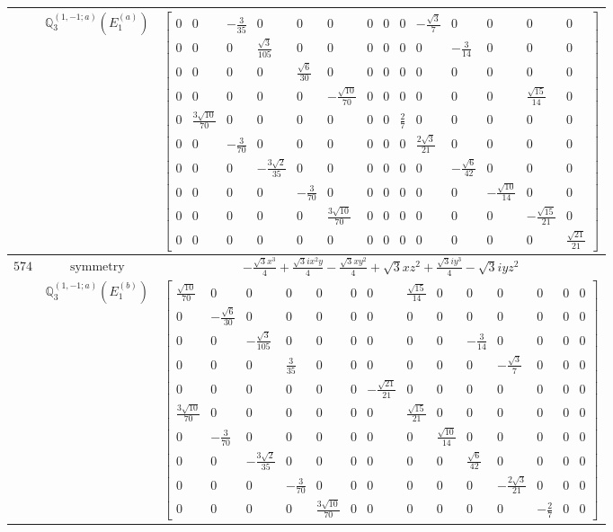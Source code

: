 \documentclass[fleqn,8pt,landscape]{jsarticle}
\begin{document}
\begin{longtable}{ccc}
$  $ & $ \mathbb{Q}_{3}^{(1,-1;a)}(E_{1}^{(a)}) $ & $ \begin{bmatrix} 0 & 0 & - \frac{3}{35} & 0 & 0 & 0 & 0 & 0 & 0 & - \frac{\sqrt{3}}{7} & 0 & 0 & 0 & 0 \\ 0 & 0 & 0 & \frac{\sqrt{3}}{105} & 0 & 0 & 0 & 0 & 0 & 0 & - \frac{3}{14} & 0 & 0 & 0 \\ 0 & 0 & 0 & 0 & \frac{\sqrt{6}}{30} & 0 & 0 & 0 & 0 & 0 & 0 & 0 & 0 & 0 \\ 0 & 0 & 0 & 0 & 0 & - \frac{\sqrt{10}}{70} & 0 & 0 & 0 & 0 & 0 & 0 & \frac{\sqrt{15}}{14} & 0 \\ 0 & \frac{3 \sqrt{10}}{70} & 0 & 0 & 0 & 0 & 0 & 0 & \frac{2}{7} & 0 & 0 & 0 & 0 & 0 \\ 0 & 0 & - \frac{3}{70} & 0 & 0 & 0 & 0 & 0 & 0 & \frac{2 \sqrt{3}}{21} & 0 & 0 & 0 & 0 \\ 0 & 0 & 0 & - \frac{3 \sqrt{2}}{35} & 0 & 0 & 0 & 0 & 0 & 0 & - \frac{\sqrt{6}}{42} & 0 & 0 & 0 \\ 0 & 0 & 0 & 0 & - \frac{3}{70} & 0 & 0 & 0 & 0 & 0 & 0 & - \frac{\sqrt{10}}{14} & 0 & 0 \\ 0 & 0 & 0 & 0 & 0 & \frac{3 \sqrt{10}}{70} & 0 & 0 & 0 & 0 & 0 & 0 & - \frac{\sqrt{15}}{21} & 0 \\ 0 & 0 & 0 & 0 & 0 & 0 & 0 & 0 & 0 & 0 & 0 & 0 & 0 & \frac{\sqrt{21}}{21} \end{bmatrix} $ \\ \hline
$ 574 $ & $ \text{symmetry} $ & $ - \frac{\sqrt{3} x^{3}}{4} + \frac{\sqrt{3} i x^{2} y}{4} - \frac{\sqrt{3} x y^{2}}{4} + \sqrt{3} x z^{2} + \frac{\sqrt{3} i y^{3}}{4} - \sqrt{3} i y z^{2} $ \\
$  $ & $ \mathbb{Q}_{3}^{(1,-1;a)}(E_{1}^{(b)}) $ & $ \begin{bmatrix} \frac{\sqrt{10}}{70} & 0 & 0 & 0 & 0 & 0 & 0 & \frac{\sqrt{15}}{14} & 0 & 0 & 0 & 0 & 0 & 0 \\ 0 & - \frac{\sqrt{6}}{30} & 0 & 0 & 0 & 0 & 0 & 0 & 0 & 0 & 0 & 0 & 0 & 0 \\ 0 & 0 & - \frac{\sqrt{3}}{105} & 0 & 0 & 0 & 0 & 0 & 0 & - \frac{3}{14} & 0 & 0 & 0 & 0 \\ 0 & 0 & 0 & \frac{3}{35} & 0 & 0 & 0 & 0 & 0 & 0 & - \frac{\sqrt{3}}{7} & 0 & 0 & 0 \\ 0 & 0 & 0 & 0 & 0 & 0 & - \frac{\sqrt{21}}{21} & 0 & 0 & 0 & 0 & 0 & 0 & 0 \\ \frac{3 \sqrt{10}}{70} & 0 & 0 & 0 & 0 & 0 & 0 & \frac{\sqrt{15}}{21} & 0 & 0 & 0 & 0 & 0 & 0 \\ 0 & - \frac{3}{70} & 0 & 0 & 0 & 0 & 0 & 0 & \frac{\sqrt{10}}{14} & 0 & 0 & 0 & 0 & 0 \\ 0 & 0 & - \frac{3 \sqrt{2}}{35} & 0 & 0 & 0 & 0 & 0 & 0 & \frac{\sqrt{6}}{42} & 0 & 0 & 0 & 0 \\ 0 & 0 & 0 & - \frac{3}{70} & 0 & 0 & 0 & 0 & 0 & 0 & - \frac{2 \sqrt{3}}{21} & 0 & 0 & 0 \\ 0 & 0 & 0 & 0 & \frac{3 \sqrt{10}}{70} & 0 & 0 & 0 & 0 & 0 & 0 & - \frac{2}{7} & 0 & 0 \end{bmatrix} $ \\ \hline

\end{longtable}
\end{document}
